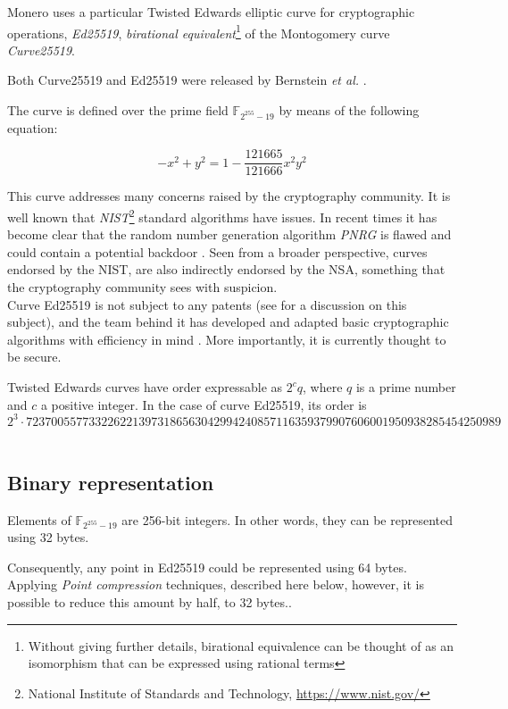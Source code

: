 Monero uses a particular Twisted Edwards elliptic curve for cryptographic operations, {\em Ed25519}, {\em birational equivalent}\footnote{Without giving further details, birational equivalence can be thought of as an isomorphism that can be expressed using rational terms} 
of the Montogomery curve {\em Curve25519}.

Both Curve25519 and Ed25519 were released by Bernstein {\em et al.} \cite{Bernstein2008, Bernstein2012, cryptoeprint:2007:286}.

The curve is defined over the prime field \(\mathbb{F}_{2^{255} - 19} \) by means of the following equation:

\[ -x^2 + y^2 = 1 - \frac{121665}{121666} x^2 y^2 \]

This curve addresses many concerns raised by the cryptography community. It is well known that {\em NIST}\footnote{National Institute of Standards and Technology, \url{https://www.nist.gov/}} 
standard algorithms have issues. In recent times it has become clear that the random number generation algorithm {\em PNRG} is flawed and could contain a potential backdoor \cite{hales2014nsa}. Seen from a broader perspective, curves endorsed by the NIST, are also indirectly endorsed by the NSA, something that the cryptography community sees with suspicion.
\\

Curve Ed25519 is not subject to any patents (see \cite{ECC-patents} for a discussion on this subject), and the team behind it has
developed and adapted basic cryptographic algorithms with efficiency in mind \cite{cryptoeprint:2007:286}.
More importantly, it is currently thought to be secure.

Twisted Edwards curves have order expressable as \(2^c q\), where \(q\) is a prime number and \(c\) a positive integer. In the case of curve Ed25519, its order is \[2^3 \cdot 7237005577332262213973186563042994240857116359379907606001950938285454250989\]
\\
\subsection{Binary representation}
Elements of \(\mathbb{F}_{2^{255} - 19} \) are 256-bit integers. In other words, they can be
represented using 32 bytes.

Consequently, any point in Ed25519 could be represented using 64 bytes.
Applying {\em Point compression} techniques, described here below, however, it is possible to reduce this amount by half, to 32 bytes..

